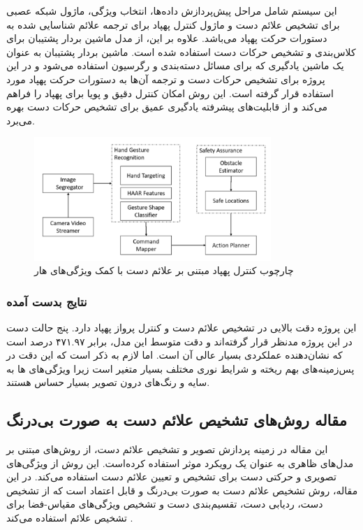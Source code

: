 این سیستم شامل مراحل پیش‌پردازش داده‌ها، انتخاب ویژگی، ماژول شبکه عصبی برای تشخیص علائم دست و ماژول کنترل پهپاد برای ترجمه 
علائم‌ شناسایی شده به دستورات حرکت پهپاد می‌باشد. علاوه بر این، از مدل ماشین بردار پشتیبان برای کلاس‌بندی و تشخیص حرکات دست استفاده شده است. ماشین بردار پشتیبان به عنوان یک ماشین یادگیری 
 که برای مسائل دسته‌بندی و رگرسیون استفاده می‌شود و در این پروژه برای تشخیص حرکات دست و ترجمه آن‌ها به دستورات حرکت پهپاد مورد استفاده قرار گرفته است. این روش امکان 
کنترل دقیق و پویا برای پهپاد را فراهم می‌کند و از قابلیت‌های پیشرفته یادگیری عمیق برای تشخیص حرکات دست بهره می‌برد.

\begin{figure}[h]
    \centering
    \includegraphics[width=0.8\textwidth]{Haar2.png}
    \caption[چارچوب کنترل پهپاد مبتنی بر علائم دست با کمک ویژگی‌های هار]{چارچوب کنترل پهپاد مبتنی بر علائم دست با کمک ویژگی‌های هار\cite{natarajan2018hand}}
\end{figure}

\subsubsection{\protect\textbf{ نتایج بدست آمده}}
این پروژه دقت بالایی در تشخیص علائم دست و کنترل پرواز پهپاد دارد. پنج حالت دست در این پروژه مدنظر قرار گرفته‌اند و دقت متوسط این مدل، برابر ۴۷۱.۹۷ درصد 
است که نشان‌دهنده عملکردی بسیار عالی آن است. اما لازم به ذکر است که این دقت در پس‌زمینه‌های بهم ریخته و شرایط نوری مختلف 
بسیار متغیر است زیرا ویژگی‌های ها به سایه و رنگ‌های درون تصویر بسیار حساس هستند.



\subsection[مقاله روش‌های تشخیص علائم دست به صورت بی‌درنگ]{مقاله روش‌های تشخیص علائم دست به صورت بی‌درنگ \protect{}}
این مقاله در زمینه پردازش تصویر و تشخیص علائم‌ دست، از روش‌های مبتنی بر مدل‌های ظاهری به عنوان یک رویکرد موثر استفاده کرده‌‌است.
این روش‌ از ویژگی‌های تصویری و حرکتی دست برای تشخیص و تعیین علائم‌ دست استفاده می‌کند. در این مقاله، روش تشخیص علائم دست به صورت بی‌درنگ و 
قابل اعتماد است که از تشخیص دست، ردیابی دست، تقسیم‌بندی دست و تشخیص ویژگی‌های مقیاس-فضا برای تشخیص علائم استفاده می‌کند \cite{fang2007real}.

